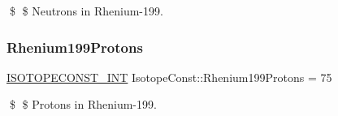 \$ \$ Neutrons in Rhenium-\/199. \mbox{\label{group___isotope_const-_rhenium-_re199_ga8eb2dc9d3e8025fd07efe01846c852b1}} 
\subsubsection{\texorpdfstring{Rhenium199\+Protons}{Rhenium199Protons}}
{\footnotesize\ttfamily \mbox{\hyperlink{group___isotope_const-_macros_ga5f18360b3e99483a35c32d789e62621c}{I\+S\+O\+T\+O\+P\+E\+C\+O\+N\+S\+T\+\_\+\+I\+NT}} Isotope\+Const\+::\+Rhenium199\+Protons = 75}

\$ \$ Protons in Rhenium-\/199. 